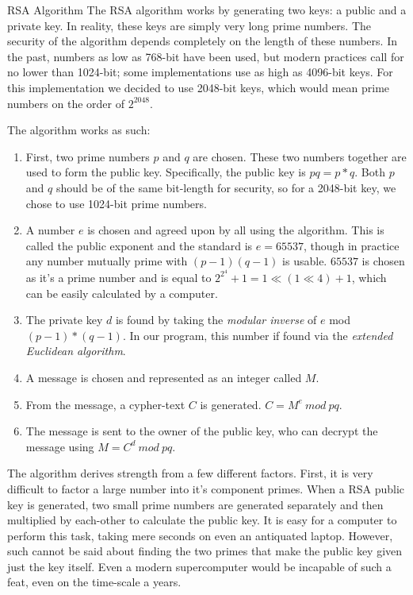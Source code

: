 \documentclass[landscape,a0paper,fontscale=.46]{baposter} %
\begin{document}
\begin{poster}
\begin{posterbox}[name=rsa,column=1,row=0]{RSA Algorithm}
The RSA algorithm works by generating two keys: a public and a private key. In reality, these keys are simply very long prime numbers. The security of the algorithm depends completely on the length of these numbers. In the past, numbers as low as 768-bit have been used, but modern practices call for no lower than 1024-bit; some implementations use as high as 4096-bit keys. For this implementation we decided to use 2048-bit keys, which would mean prime numbers on the order of $2^{2048}$.

The algorithm works as such:
\begin{enumerate}
	\item First, two prime numbers $p$ and $q$ are chosen. These two numbers together are used to form the public key. Specifically, the public key is ${pq = p * q}$. Both $p$ and $q$ should be of the same bit-length for security, so for a 2048-bit key, we chose to use 1024-bit prime numbers. 
	\item A number $e$ is chosen and agreed upon by all using the algorithm. This is called the public exponent and the standard is $e = 65537$, though in practice any number mutually prime with ${(p-1)(q-1)}$ is usable. $65537$ is chosen as it's a prime number and is equal to ${2^{2^4}+1 = 1 \ll (1 \ll 4) + 1}$, which can be easily calculated by a computer.
	\item The private key $d$ is found by taking the \emph{modular inverse} of $e$ mod ${(p-1)*(q-1)}$. In our program, this number if found via the \emph{extended Euclidean algorithm}.
	\item A message is chosen and represented as an integer called $M$.
	\item From the message, a cypher-text $C$ is generated. $C = M^e\ mod\ pq$.
	\item The message is sent to the owner of the public key, who can decrypt the message using $M = C^d\ mod\ pq$.
\end{enumerate}

The algorithm derives strength from  a few different factors. First, it is very difficult to factor a large number into it's component primes. When a RSA public key is generated, two small prime numbers are generated separately and then multiplied by each-other to calculate the public key. It is easy for a computer to perform this task, taking mere seconds on even an antiquated laptop. However, such cannot be said about finding the two primes that make the public key given just the key itself. Even a modern supercomputer would be incapable of such a feat, even on the time-scale a years.


\end{posterbox}
\end{poster}
\end{document}
